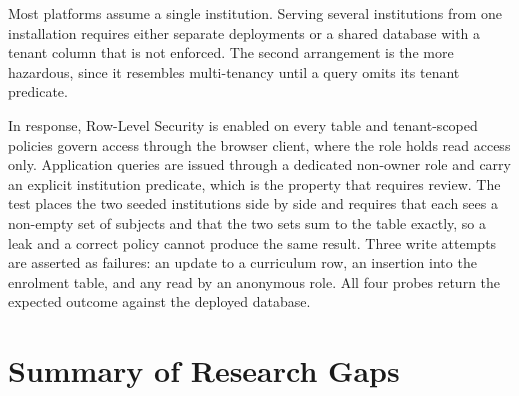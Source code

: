 Most platforms assume a single institution. Serving several institutions from one installation requires either separate deployments or a shared database with a tenant column that is not enforced. The second arrangement is the more hazardous, since it resembles multi-tenancy until a query omits its tenant predicate.

In response, Row-Level Security is enabled on every table and tenant-scoped policies govern access through the browser client, where the role holds read access only. Application queries are issued through a dedicated non-owner role and carry an explicit institution predicate, which is the property that requires review. The test places the two seeded institutions side by side and requires that each sees a non-empty set of subjects and that the two sets sum to the table exactly, so a leak and a correct policy cannot produce the same result. Three write attempts are asserted as failures: an update to a curriculum row, an insertion into the enrolment table, and any read by an anonymous role. All four probes return the expected outcome against the deployed database.

\section{Summary of Research Gaps}

\begin{table}[H]
\centering
\caption{Summary of Research Gaps and Proposed Solutions}
\label{tab:research_gaps}
\end{table}

